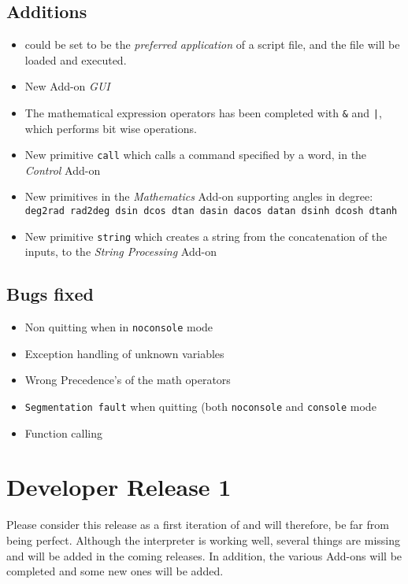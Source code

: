 \subsection{Additions}

\begin{itemize}
\item \squirrel could be set to be the {\em preferred application} of a \squirrel script file, and the file will be loaded and executed. 
\item New Add-on {\em GUI}
\item The mathematical expression operators has been completed with \verb+&+ and \verb+|+, which performs bit wise operations.
\item New primitive {\tt call} which calls a command specified by a word, in the {\em Control} Add-on
\item New primitives in the {\em Mathematics} Add-on supporting angles in degree: {\tt deg2rad rad2deg dsin dcos dtan dasin dacos datan dsinh dcosh dtanh}
\item New primitive {\tt string} which creates a string from the concatenation of the inputs, to the {\em String Processing} Add-on
\end{itemize}

\subsection{Bugs fixed}

\begin{itemize}
\item Non quitting \squirrel when in {\tt noconsole} mode
\item Exception handling of unknown variables
\item Wrong Precedence's of the math operators
\item {\tt Segmentation fault} when quitting \squirrel (both {\tt noconsole} and {\tt console} mode
\item Function calling
\end{itemize}

\section{Developer Release 1}

Please consider this release as a first iteration of \squirrel and will therefore, be far from being perfect. Although the interpreter is working well, several things are missing and will be added in the coming releases. In addition, the various Add-ons will be completed and some new ones will be added.\\


